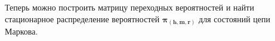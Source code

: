 Теперь можно построить матрицу переходных вероятностей и найти стационарное распределение вероятностей $\bm{\pi_{(h,m,r)}}$ для состояний цепи Маркова. 
